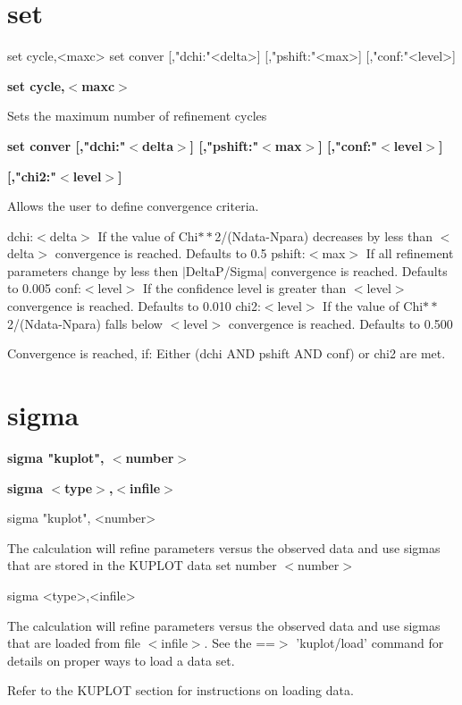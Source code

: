 \section{set}
\begin{MacVerbatim}
set cycle,<maxc>
set conver [,"dchi:"<delta>] [,"pshift:"<max>] [,"conf:"<level>]
\end{MacVerbatim}
{\bf set cycle,$ <$maxc$> $ \par }
\vspace{3pt}
Sets the maximum number of refinement cycles 
\par
{\bf set conver [,"dchi:"$ <$delta$> $] [,"pshift:"$ <$max$> $] [,"conf:"$ <$level$> $] \par }
{\bf            [,"chi2:"$ <$level$> $] \par }
\par
\vspace{3pt}
Allows the user to define convergence criteria. 
\par
dchi:$ <$delta$> $ 
  If the value of Chi$**$2/(Ndata-Npara) decreases by less than $ <$delta$> $ 
  convergence is reached. 
  Defaults to 0.5 
pshift:$ <$max$> $ 
  If all refinement parameters change by less then $| $DeltaP/Sigma$| $ 
  convergence is reached. 
  Defaults to 0.005 
conf:$ <$level$> $ 
  If the confidence level is greater than $ <$level$> $ 
  convergence is reached. 
  Defaults to 0.010 
chi2:$ <$level$> $ 
  If the value of Chi$**$2/(Ndata-Npara) falls below $ <$level$> $ 
  convergence is reached. 
  Defaults to 0.500 
\par
Convergence is reached, if: 
Either 
   (dchi AND pshift AND conf) 
or 
   chi2 
are met. 
\section{sigma}
{\bf sigma "kuplot", $ <$number$> $ \par }
{\bf sigma $ <$type$> $,$ <$infile$> $ \par }
\par
\begin{MacVerbatim}
sigma "kuplot", <number>
\end{MacVerbatim}
\vspace{3pt}
The calculation will refine parameters versus the observed data 
and use sigmas 
that are stored in the KUPLOT data set number $ <$number$> $ 
\par
\begin{MacVerbatim}
sigma <type>,<infile>
\end{MacVerbatim}
The calculation will refine parameters versus the observed data 
and use sigmas 
that are loaded from file $ <$infile$> $. 
   See the ==$> $ 'kuplot/load' command for details on proper 
   ways to load a data set. 
\par
Refer to the KUPLOT section for instructions on loading data. 

